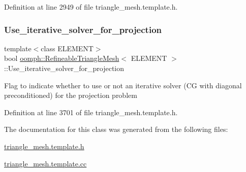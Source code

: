 Definition at line 2949 of file triangle\+\_\+mesh.\+template.\+h.

\mbox{\label{classoomph_1_1RefineableTriangleMesh_a6b38d79f86053e7acb8f92efe06d9c9a}} 
\subsubsection{\texorpdfstring{Use\+\_\+iterative\+\_\+solver\+\_\+for\+\_\+projection}{Use\_iterative\_solver\_for\_projection}}
{\footnotesize\ttfamily template$<$class E\+L\+E\+M\+E\+NT$>$ \\
bool \hyperlink{classoomph_1_1RefineableTriangleMesh}{oomph\+::\+Refineable\+Triangle\+Mesh}$<$ E\+L\+E\+M\+E\+NT $>$\+::Use\+\_\+iterative\+\_\+solver\+\_\+for\+\_\+projection\hspace{0.3cm}{\ttfamily [protected]}}

Flag to indicate whether to use or not an iterative solver (CG with diagonal preconditioned) for the projection problem 

Definition at line 3701 of file triangle\+\_\+mesh.\+template.\+h.



The documentation for this class was generated from the following files\+:\begin{DoxyCompactItemize}
\item 
\hyperlink{triangle__mesh_8template_8h}{triangle\+\_\+mesh.\+template.\+h}\item 
\hyperlink{triangle__mesh_8template_8cc}{triangle\+\_\+mesh.\+template.\+cc}\end{DoxyCompactItemize}
